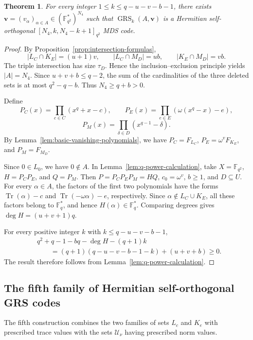 \documentclass[preprint,12pt,a4paper]{elsarticle}
\newtheorem{theorem}{Theorem}[section]
\newcommand{\Tr}{\operatorname{Tr}}
\newcommand{\GRS}{\operatorname{GRS}}
\begin{document}
\begin{theorem}\label{thm:fourth-grs}
For every integer $1\le k\le q-u-v-b-1$, there exists $\boldsymbol v=(v_\alpha)_{\alpha\in A}\in (\mathbb F_{q^2}^{*})^{N_4}$ such that $\GRS_k(A,\boldsymbol v)$ is a Hermitian self-orthogonal $[N_4,k,N_4-k+1]_{q^2}$ MDS code.
\end{theorem}

\begin{proof}
By Proposition~\ref{prop:intersection-formulas},
\[
 |L_C\cap K_E|=(u+1)v,
 \qquad
 |L_C\cap M_D|=ub,
 \qquad
 |K_E\cap M_D|=vb.
\]
The triple intersection has size $\tau_D$. Hence the inclusion--exclusion principle yields $|A|=N_4$. Since $u+v+b\le q-2$, the sum of the cardinalities of the three deleted sets is at most $q^2-q-b$. Thus $N_4\ge q+b>0$.

Define
\[
 P_C(x)=\prod_{c\in C}(x^q+x-c),
 \qquad
 P_E(x)=\prod_{e\in E}(\omega(x^q-x)-e),
\]
\[
 P_M(x)=\prod_{\delta\in D}(x^{q-1}-\delta).
\]
By Lemma~\ref{lem:basic-vanishing-polynomials}, we have $P_C=F_{L_C}$, $P_E=\omega^vF_{K_E}$, and $P_M=F_{M_D}$.

Since $0\in L_0$, we have $0\notin A$. In Lemma~\ref{lem:q-power-calculation}, take $X=\mathbb F_{q^2}$, $H=P_CP_E$, and $Q=P_M$. Then $P=P_CP_EP_M=HQ$, $c_0=\omega^v$, $b\ge1$, and $D\subseteq U$. For every $\alpha\in A$, the factors of the first two polynomials have the forms $\Tr(\alpha)-c$ and $\Tr(-\omega\alpha)-e$, respectively. Since $\alpha\notin L_C\cup K_E$, all these factors belong to $\mathbb F_q^{*}$, and hence $H(\alpha)\in\mathbb F_q^{*}$. Comparing degrees gives $\deg H=(u+v+1)q$.

For every positive integer $k$ with $k\le q-u-v-b-1$,
\[
\begin{aligned}
 &q^2+q-1-bq-\deg H-(q+1)k\\
 &\qquad=(q+1)(q-u-v-b-1-k)+(u+v+b)\ge0.
\end{aligned}
\]
The result therefore follows from Lemma~\ref{lem:q-power-calculation}.
\end{proof}

\subsection{The fifth family of Hermitian self-orthogonal GRS codes}

The fifth construction combines the two families of sets $L_c$ and $K_e$ with prescribed trace values with the sets $\mathcal U_\nu$ having prescribed norm values.
\end{document}
